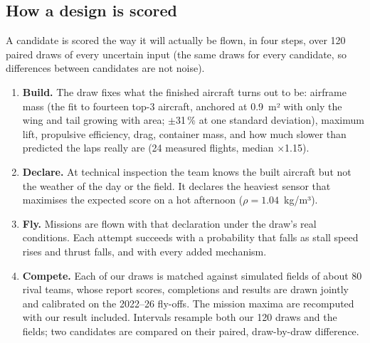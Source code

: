 \subsection{How a design is scored}
A candidate is scored the way it will actually be flown, in four steps, over 120 paired draws of every uncertain input (the same draws for every candidate, so differences between candidates are not noise).

\begin{enumerate}
\item \textbf{Build.} The draw fixes what the finished aircraft turns out to be: airframe mass (the fit to fourteen top-3 aircraft, anchored at 0.9~m² with only the wing and tail growing with area; $\pm$31\,\% at one standard deviation), maximum lift, propulsive efficiency, drag, container mass, and how much slower than predicted the laps really are (24 measured flights, median $\times$1.15).
\item \textbf{Declare.} At technical inspection the team knows the built aircraft but not the weather of the day or the field. It declares the heaviest sensor that maximises the expected score on a hot afternoon ($\rho = 1.04$~kg/m³).
\item \textbf{Fly.} Missions are flown with that declaration under the draw's real conditions. Each attempt succeeds with a probability that falls as stall speed rises and thrust falls, and with every added mechanism.
\item \textbf{Compete.} Each of our draws is matched against simulated fields of about 80 rival teams, whose report scores, completions and results are drawn jointly and calibrated on the 2022--26 fly-offs. The mission maxima are recomputed with our result included. Intervals resample both our 120 draws and the fields; two candidates are compared on their paired, draw-by-draw difference.
\end{enumerate}



